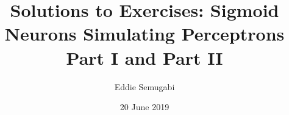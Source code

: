 \documentclass[a4paper,12pt]{article}
\begin{document}
\title{Solutions to Exercises: Sigmoid Neurons
Simulating Perceptrons Part I and Part II}
\author{Eddie Semugabi}
\date{20 June 2019}
\maketitle
\end{document}
